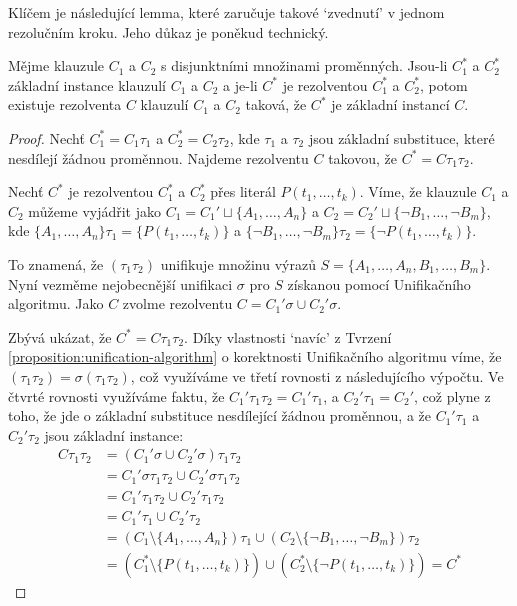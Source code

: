 Klíčem je následující lemma, které zaručuje takové `zvednutí' v jednom rezolučním kroku. Jeho důkaz je poněkud technický.

\begin{lemma}\label{lemma:lifting-lemma}
Mějme klauzule $C_1$ a $C_2$ s disjunktními množinami proměnných. Jsou-li $C^*_1$ a $C^*_2$ základní instance klauzulí $C_1$ a $C_2$ a je-li $C^*$ je rezolventou $C^*_1$ a $C^*_2$, potom existuje rezolventa $C$ klauzulí $C_1$ a $C_2$ taková, že $C^*$ je základní instancí $C$.
\end{lemma}
\begin{proof}
Nechť $C^*_1=C_1\tau_1$ a $C^*_2=C_2\tau_2$, kde $\tau_1$ a $\tau_2$ jsou základní substituce, které nesdílejí žádnou proměnnou. Najdeme rezolventu $C$ takovou, že $C^*=C\tau_1\tau_2$.

Nechť $C^*$ je rezolventou $C_1^*$ a $C_2^*$ přes literál $P(t_1,\dots,t_k)$. Víme, že klauzule $C_1$ a $C_2$ můžeme vyjádřit jako $C_1=C_1' \sqcup \{A_1,\dots,A_n\}$ a $C_2=C_2' \sqcup \{\neg B_1,\dots,\neg B_m\}$, kde $\{A_1,\dots,A_n\}\tau_1=\{P(t_1,\dots,t_k)\}$ a $\{\neg B_1,\dots,\neg B_m\}\tau_2=\{\neg P(t_1,\dots,t_k)\}$.

To znamená, že $(\tau_1\tau_2)$ unifikuje množinu výrazů $S=\{A_1,\dots,A_n,B_1,\dots,B_m\}$. Nyní vezměme nejobecnější unifikaci $\sigma$ pro $S$ získanou pomocí Unifikačního algoritmu. Jako $C$ zvolme rezolventu $C=C_1'\sigma \cup C_2'\sigma$.

Zbývá ukázat, že $C^*=C\tau_1\tau_2$. Díky vlastnosti `navíc' z Tvrzení \ref{proposition:unification-algorithm} o korektnosti Unifikačního algoritmu víme, že $(\tau_1\tau_2)=\sigma(\tau_1\tau_2)$, což využíváme ve třetí rovnosti z následujícího výpočtu. Ve čtvrté rovnosti využíváme faktu, že $C_1'\tau_1\tau_2=C_1'\tau_1$, a $C_2'\tau_1=C_2'$, což plyne z toho, že jde o základní substituce nesdílející žádnou proměnnou, a že $C_1'\tau_1$ a $C_2'\tau_2$ jsou základní instance:
\begin{align*}
    C\tau_1\tau_2&= (C_1'\sigma \cup C_2'\sigma)\tau_1\tau_2\\
    &=C_1'\sigma\tau_1\tau_2 \cup C_2'\sigma\tau_1\tau_2\\
    &=C_1'\tau_1\tau_2 \cup C_2'\tau_1\tau_2\\
    &=C_1'\tau_1 \cup C_2'\tau_2\\
    &=(C_1\setminus\{A_1,\dots,A_n\})\tau_1\cup (C_2\setminus\{\neg B_1,\dots,\neg B_m\})\tau_2\\
    &=(C_1^*\setminus\{P(t_1,\dots,t_k)\})\cup(C_2^*\setminus \{\neg P(t_1,\dots,t_k)\})=C^*
\end{align*}
\end{proof}

